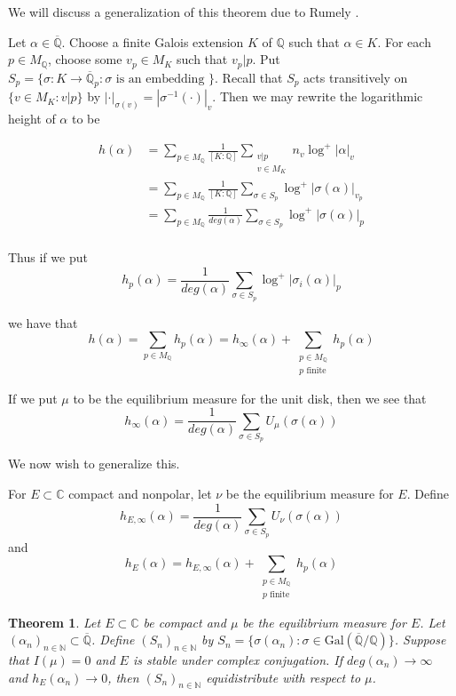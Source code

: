 \documentclass[12pt]{amsart}
\newtheorem{thm}{Theorem}[subsection]
\theoremstyle{definition}
\theoremstyle{remark}
\theoremstyle{definition}
\newcommand{\sbs}{\subset}
\newcommand{\N}{\mathbb{N}}
\newcommand{\C}{\mathbb{C}}
\newcommand{\Q}{\mathbb{Q}}
\newcommand{\ol}{\overline}
\begin{document}
We will discuss a generalization of this theorem due to Rumely \cite{R}. 

Let $\alpha \in \ol{\Q}$. Choose a finite Galois extension $K$ of $\Q$ such that $\alpha \in K$. For each $p \in M_{\Q}$, choose some $v_p \in M_K$ such that $v_p|p$. Put $S_p = \{\sigma :K \rightarrow \ol{\Q}_p: \sigma \text{ is an embedding }\}$. Recall that $S_p$ acts transitively on $\{v \in M_K: v|p\}$ by $|\cdot|_{\sigma(v)} = |\sigma^{-1}( \cdot)|_v$. Then we may rewrite the logarithmic height of $\alpha$ to be 

\begin{align*}
h(\alpha)
&= \sum_{p \in M_{\Q}} \frac{1}{[K:\Q]} \sum_{\substack{v|p\\v \in M_K}}n_v \log^+|\alpha|_v\\
&= \sum_{p \in M_{\Q}} \frac{1}{[K:\Q]} \sum_{\sigma \in S_p} \log^+ |\sigma(\alpha)|_{v_p}\\
&= \sum_{p \in M_{\Q}} \frac{1}{deg(\alpha)}\sum_{\sigma \in S_p} \log^+ |\sigma(\alpha)|_{p}\\
\end{align*}

Thus if we put $$h_p(\alpha) = \frac{1}{deg(\alpha)}\sum_{\sigma \in S_p} \log^+ |\sigma_i(\alpha)|_{p}$$ 

we have that $$h(\alpha) = \sum_{p \in M_{\Q}} h_p(\alpha) = h_{\infty}(\alpha) + \sum_{\substack{p \in M_{\Q}\\ p \text{ finite}}} h_p(\alpha)$$

If we put $\mu$ to be the equilibrium measure for the unit disk, then we see that $$h_{\infty}(\alpha) = \frac{1}{deg(\alpha)} \sum_{\sigma \in S_p} U_{\mu}(\sigma(\alpha))$$

We now wish to generalize this.

For $E \sbs \C$ compact and nonpolar, let $\nu$ be the equilibrium measure for $E$. Define $$h_{E,\infty}(\alpha) = \frac{1}{deg(\alpha)} \sum_{\sigma \in S_p} U_{\nu}(\sigma(\alpha))$$ and $$h_E(\alpha) = h_{E,\infty}(\alpha) + \sum_{\substack{p \in M_{\Q}\\ p \text{ finite}}} h_p(\alpha)$$

\begin{thm}

Let $E \sbs \C $ be compact and $\mu$ be the equilibrium measure for $E$. Let $(\alpha_n)_{n \in \N} \sbs \ol{\Q}$. Define $(S_n)_{n \in \N}$ by $S_n = \{\sigma(\alpha_n): \sigma \in \mathrm{Gal}(\ol{ \Q }/ \Q )\}$. Suppose that $I(\mu) = 0$ and $E$ is stable under complex conjugation. If $deg(\alpha_n) \rightarrow \infty$ and $h_E(\alpha_n) \rightarrow 0$, then $(S_n)_{n \in \N}$ equidistribute with respect to $\mu$. 

\end{thm}
\end{document}
